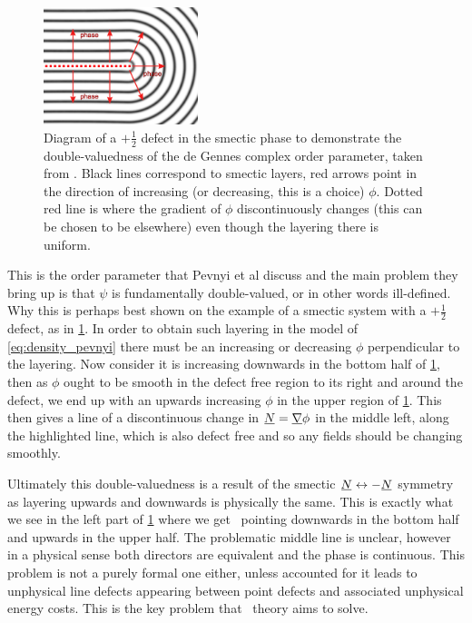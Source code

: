 \documentclass[12pt]{article}
\newcommand{\suf}[2]{\stackunder[0.5pt]{\stackunder[1pt]{\ensuremath{#1}}{\rule{\widthof{\ensuremath{#2}}*\real{0.9}}{.1ex}}}{}}
\newcommand{\duf}[2]{\stackunder[0.5pt]{\stackunder[0.8pt]{\stackunder[1pt]{\ensuremath{#1}}{\rule{\widthof{\ensuremath{#2}}*\real{0.9}}{.1ex}}}{\rule{\widthof{\ensuremath{#2}}*\real{0.9}}{.1ex}}}{}}
\newcommand{\su}[1]{\suf{#1}{#1}}
\newcommand{\du}[1]{\duf{#1}{#1}}
\newcommand{\mgrad}{\suf{\nabla}{K}}
\newcommand{\NN}{\su{N}}
\newcommand{\EE}{\du{E}}
\begin{document}
\begin{figure}[t]
    \begin{center}
        \includegraphics[width=0.4\textwidth]{figures/pevnyi.pdf}
    \end{center}
    \caption{
        Diagram of a $+\frac{1}{2}$ defect in the smectic phase to demonstrate the double-valuedness of the de Gennes complex order parameter, taken from \cite{pevnyiModelingSmecticLayers2014}.
        Black lines correspond to smectic layers, red arrows point in the direction of increasing (or decreasing, this is a choice) $\phi$.
        Dotted red line is where the gradient of $\phi$ discontinuously changes (this can be chosen to be elsewhere) even though the layering there is uniform.
    }\label{fig:pevnyi}
\end{figure}

This is the order parameter that Pevnyi et al discuss and the main problem they bring up is that $\psi$ is fundamentally double-valued, or in other words ill-defined.
Why this is perhaps best shown on the example of a smectic system with a $+\frac{1}{2}$ defect, as in \cref{fig:pevnyi}.
In order to obtain such layering in the model of \cref{eq:density_pevnyi} there must be an increasing or decreasing $\phi$ perpendicular to the layering.
Now consider it is increasing downwards in the bottom half of \cref{fig:pevnyi}, then as $\phi$ ought to be smooth in the defect free region to its right and around the defect, we end up with an upwards increasing $\phi$ in the upper region of \cref{fig:pevnyi}.
This then gives a line of a discontinuous change in $\su{N} = \mgrad \phi$ in the middle left, along the highlighted line, which is also defect free and so any fields should be changing smoothly.

Ultimately this double-valuedness is a result of the smectic $\su{N} \leftrightarrow -\su{N}$ symmetry as layering upwards and downwards is physically the same.
This is exactly what we see in the left part of \cref{fig:pevnyi} where we get \NN\ pointing downwards in the bottom half and upwards in the upper half.
The problematic middle line is unclear, however in a physical sense both directors are equivalent and the phase is continuous.
This problem is not a purely formal one either, unless accounted for it leads to unphysical line defects appearing between point defects\cite{pevnyiModelingSmecticLayers2014} and associated unphysical energy costs.
This is the key problem that \EE\ theory aims to solve.
\end{document}
